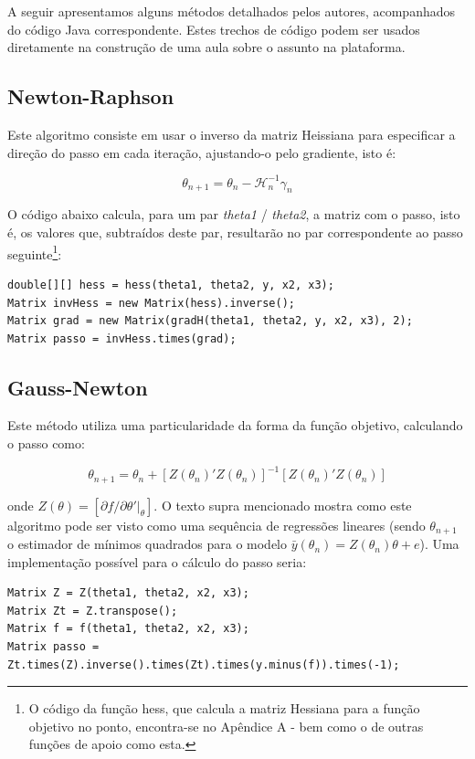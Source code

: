 \documentclass{abnt}
\newenvironment{mylisting}
{\begin{list}{}{\setlength{\leftmargin}{1em}}\item\scriptsize\bfseries}
{\end{list}}
\begin{document}
A seguir apresentamos alguns métodos detalhados pelos autores, acompanhados do código Java correspondente. Estes trechos de código podem ser usados diretamente na construção de uma aula sobre o assunto na plataforma.

\subsection{Newton-Raphson}

Este algoritmo consiste em usar o inverso da matriz Heissiana para especificar a direção do passo em cada iteração, ajustando-o pelo gradiente, isto é:

\[ \theta_{n+1} = \theta_{n} - \mathcal{H}_{n}^{-1}\gamma_{n} \]

O código abaixo calcula, para um par \textit{theta1} / \textit{theta2}, a matriz com o passo, isto é, os valores que, subtraídos deste par, resultarão no par correspondente ao passo seguinte\footnote{O código da função hess, que calcula a matriz Hessiana para a função objetivo no ponto, encontra-se no Apêndice A - bem como o de outras funções de apoio como esta.}:

\begin{mylisting}
\begin{verbatim}
double[][] hess = hess(theta1, theta2, y, x2, x3);
Matrix invHess = new Matrix(hess).inverse();
Matrix grad = new Matrix(gradH(theta1, theta2, y, x2, x3), 2);
Matrix passo = invHess.times(grad);
\end{verbatim}
\end{mylisting}

\subsection{Gauss-Newton}

Este método utiliza uma particularidade da forma da função objetivo, calculando o passo como:

\[ \theta_{n+1} = \theta_{n} + [Z(\theta_n)'Z(\theta_n)]^{-1}[Z(\theta_n)'Z(\theta_n)] \]

onde $Z(\theta)=[\partial f/ \partial \theta'\vert_{\theta}]$. O texto supra mencionado mostra como este algoritmo pode ser visto como uma sequência de regressões lineares (sendo $\theta_{n+1}$ o estimador de mínimos quadrados para o modelo $\bar y(\theta_{n})=Z(\theta_{n})\theta + e$). Uma implementação possível para o cálculo do passo seria:

\begin{mylisting}
\begin{verbatim}
Matrix Z = Z(theta1, theta2, x2, x3); 
Matrix Zt = Z.transpose(); 
Matrix f = f(theta1, theta2, x2, x3); 
Matrix passo = Zt.times(Z).inverse().times(Zt).times(y.minus(f)).times(-1); 
\end{verbatim}
\end{mylisting}
\end{document}
